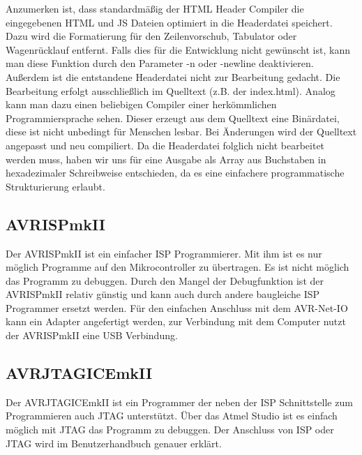 Anzumerken ist, dass standardmäßig der HTML Header Compiler die eingegebenen
HTML und JS Dateien optimiert in die Headerdatei speichert. Dazu wird die
Formatierung für den Zeilenvorschub, Tabulator oder Wagenrücklauf entfernt.
Falls dies für die Entwicklung nicht gewünscht ist, kann man diese Funktion
durch den Parameter \textrm{-n oder -newline} deaktivieren.
Außerdem ist die entstandene Headerdatei nicht zur Bearbeitung gedacht. Die
Bearbeitung erfolgt ausschließlich im Quelltext (z.B. der index.html). Analog
kann man dazu einen beliebigen Compiler einer herkömmlichen Programmiersprache sehen. Dieser
erzeugt aus dem Quelltext eine Binärdatei, diese ist nicht unbedingt
für Menschen lesbar. Bei Änderungen wird der Quelltext angepasst und neu
compiliert. Da die Headerdatei folglich nicht bearbeitet werden muss, haben wir
uns für eine Ausgabe als Array aus Buchstaben in hexadezimaler Schreibweise
entschieden, da es eine einfachere programmatische Strukturierung erlaubt.

\subsection{AVRISPmkII}

Der AVRISPmkII ist ein einfacher \ac{ISP} Programmierer. Mit ihm ist es nur
möglich Programme auf den Mikrocontroller zu übertragen. Es ist nicht möglich
das Programm zu debuggen. Durch den Mangel der Debugfunktion ist der AVRISPmkII
relativ günstig und kann auch durch andere baugleiche \ac{ISP} Programmer ersetzt
werden. Für den einfachen Anschluss mit dem AVR-Net-IO kann ein Adapter
angefertigt werden, zur Verbindung mit dem Computer nutzt der AVRISPmkII eine
USB Verbindung.

\subsection{AVRJTAGICEmkII}

Der AVRJTAGICEmkII ist ein Programmer der neben der \ac{ISP} Schnittstelle
zum Programmieren auch \ac{JTAG} unterstützt. Über das Atmel Studio ist es
einfach möglich mit \ac{JTAG} das Programm zu debuggen.
Der Anschluss von ISP oder JTAG wird im Benutzerhandbuch genauer erklärt.
